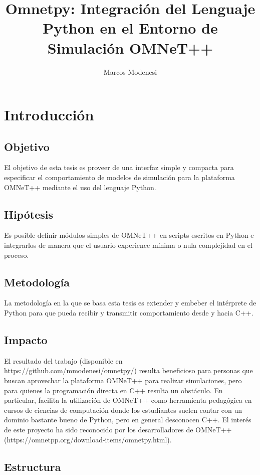 \documentclass[]{article}
\title{Omnetpy: Integración del Lenguaje Python en el Entorno de Simulación OMNeT++}
\author{Marcos Modenesi}
\begin{document}
\maketitle

\section{Introducción}
\subsection{Objetivo}

El objetivo de esta tesis es proveer de una interfaz simple y compacta para
especificar el comportamiento de modelos de simulación para la plataforma
OMNeT++ mediante el uso del lenguaje Python.

\subsection{Hipótesis}

Es posible definir módulos simples de OMNeT++ en scripts escritos en Python e
integrarlos de manera que el usuario experience mínima o nula complejidad en el
proceso.

\subsection{Metodología}

La metodología en la que se basa esta tesis es extender y embeber el intérprete
de Python para que pueda recibir y transmitir comportamiento desde y hacia C++.

\subsection{Impacto}

El resultado del trabajo (disponible en https://github.com/mmodenesi/omnetpy/)
resulta beneficioso para personas que buscan aprovechar la plataforma OMNeT++
para realizar simulaciones, pero para quienes la programación directa en C++
resulta un obstáculo. En particular, facilita la utilización de OMNeT++ como
herramienta pedagógica en cursos de ciencias de computación donde los
estudiantes suelen contar con un dominio bastante bueno de Python, pero en
general desconocen C++.  El interés de este proyecto ha sido reconocido por los
desarrolladores de OMNeT++ (https://omnetpp.org/download-items/omnetpy.html).

\subsection{Estructura}
\end{document}
